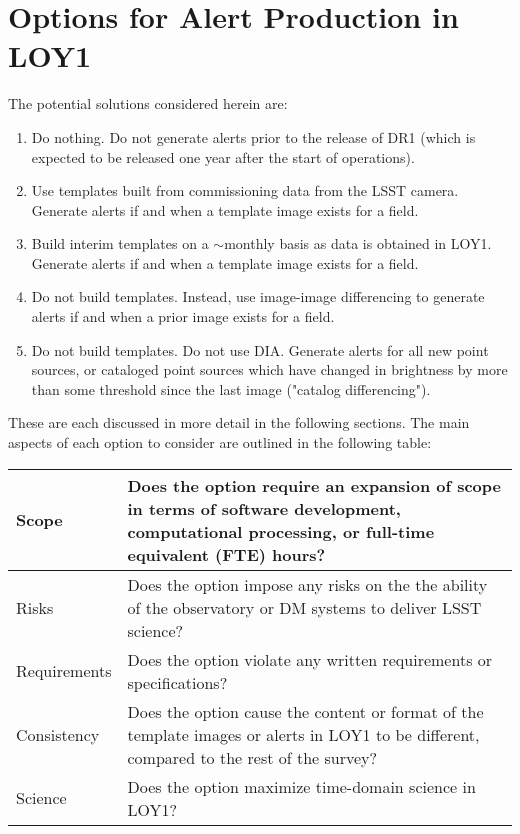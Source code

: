 \documentclass[DM,lsstdraft,toc]{lsstdoc}
\begin{document}
\clearpage
\section{Options for Alert Production in LOY1}\label{sec:potsol}

The potential solutions considered herein are:
\begin{enumerate}
\item Do nothing. Do not generate alerts prior to the release of DR1 (which is expected to be released one year after the start of operations).
\item Use templates built from commissioning data from the LSST camera. Generate alerts if and when a template image exists for a field. 
\item Build interim templates on a $\sim$monthly basis as data is obtained in LOY1. Generate alerts if and when a template image exists for a field.
\item Do not build templates. Instead, use image-image differencing to generate alerts if and when a prior image exists for a field.
\item Do not build templates. Do not use DIA. Generate alerts for all new point sources, or cataloged point sources which have changed in brightness by more than some threshold since the last image ("catalog differencing").
\end{enumerate}

These are each discussed in more detail in the following sections.
The main aspects of each option to consider are outlined in the following table:
\begin{center}
\begin{tabular}{|p{2.5cm}|p{13cm}|}
\hline
Scope & Does the option require an expansion of scope in terms of software development, computational processing, or full-time equivalent (FTE) hours? \\
\hline
Risks & Does the option impose any risks on the the ability of the observatory or DM systems to deliver LSST science?  \\
\hline
Requirements & Does the option violate any written requirements or specifications? \\
\hline
Consistency & Does the option cause the content or format of the template images or alerts in LOY1 to be different, compared to the rest of the survey? \\ 
\hline
Science & Does the option maximize time-domain science in LOY1? \\
\hline
\end{tabular}
\end{center} 
\end{document}
